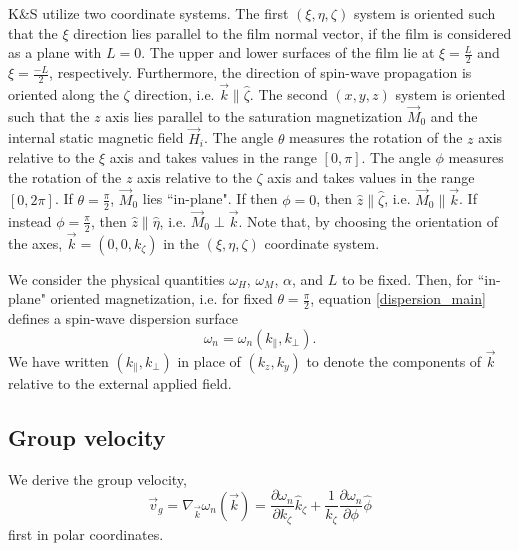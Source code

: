 \documentclass{article}
\begin{document}
K\&{}S utilize two coordinate systems. The first $(\xi,\eta,\zeta)$ system is oriented such that the $\xi$ direction lies parallel to the film normal vector, if the film is considered as a plane with $L=0$. The upper and lower surfaces of the film lie at $\xi = \frac{L}{2}$ and $\xi = \frac{-L}{2}$, respectively. Furthermore, the direction of spin-wave propagation is oriented along the $\zeta$ direction, i.e. $\vec{k} \parallel \hat{\zeta}$. The second $(x,y,z)$ system is oriented such that the $z$ axis lies parallel to the saturation magnetization $\vec{M}_{0}$ and the internal static magnetic field $\vec{H}_{i}$. The angle $\theta$ measures the rotation of the $z$ axis relative to the $\xi$ axis and takes values in the range $[0,\pi]$. The angle $\phi$ measures the rotation of the $z$ axis relative to the $\zeta$ axis and takes values in the range $[0, 2 \pi]$. If $\theta = \frac{\pi}{2}$, $\vec{M}_{0}$ lies ``in-plane". If then $\phi = 0$, then $\hat{z} \parallel \hat{\zeta}$, i.e. $\vec{M}_{0} \parallel \vec{k}$. If instead $\phi = \frac{\pi}{2}$, then $\hat{z} \parallel \hat{\eta}$, i.e. $\vec{M}_{0} \perp \vec{k}$. Note that, by choosing the orientation of the axes, $\vec{k} = (0,0,k_{\zeta})$ in the $(\xi,\eta,\zeta)$ coordinate system.

We consider the physical quantities $\omega_{H}$, $\omega_{M}$, $\alpha$, and $L$ to be fixed. Then, for ``in-plane" oriented magnetization, i.e. for fixed $\theta = \frac{\pi}{2}$, equation \eqref{dispersion_main} defines a spin-wave dispersion surface 
\begin{equation}
\omega_{n} = \omega_{n} \left(k_{\parallel} , k_{\perp} \right).
\end{equation} 
We have written $\left( k_{\parallel}, k_{\perp} \right)$ in place of $\left( k_{z} , k_{y} \right)$ to denote the components of $\vec{k}$ relative to the external applied field.

\subsection{Group velocity}
We derive the group velocity,
\begin{equation}
\vec{v}_{g} = \nabla_{\vec{k}} \omega_{n} (\vec{k}) = \frac{\partial \omega_{n}}{\partial k_{\zeta}} \hat{k}_{\zeta} + \frac{1}{k_{\zeta}} \frac{\partial \omega_{n}}{\partial \phi} \hat{\phi}
\end{equation}
first in polar coordinates. 
\end{document}
